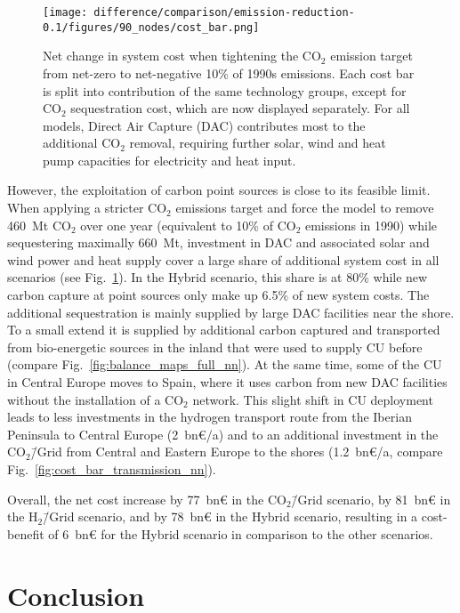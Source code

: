 \documentclass[twocolumn]{article}
\newcommand{\COtwo}{CO$_2$}
\newcommand{\carbon}{CO$_2$}
\newcommand{\carbongrid}{CO$_2$\=/Grid}
\newcommand{\carbonscenario}{CO$_2$\=/Grid scenario}
\newcommand{\hydrogenscenario}{H$_2$\=/Grid scenario}
\newcommand{\hybridscenario}{Hybrid scenario}
\begin{document}
\begin{figure}[htb!]
    \centering
    \texttt{[image: difference/comparison/emission-reduction-0.1/figures/90\_nodes/cost\_bar.png]}
    \caption[short]{Net change in system cost when tightening the \COtwo{} emission target from net-zero to net-negative 10\% of 1990s emissions. Each cost bar is split into contribution of the same technology groups, except for \carbon{} sequestration cost, which are now displayed separately. For all models, Direct Air Capture (DAC) contributes most to the additional \carbon{} removal, requiring further solar, wind and heat pump capacities for electricity and heat input.}
    \label{fig:net-negative_cost_bar}
\end{figure}


However, the exploitation of carbon point sources is close to its feasible limit. When applying a stricter \carbon{} emissions target and force the model to remove 460~Mt \carbon{} over one year (equivalent to 10\% of \carbon{} emissions in 1990) while sequestering maximally 660~Mt, investment in DAC and associated solar and wind power and heat supply cover a large share of additional system cost in all scenarios (see Fig.~\ref{fig:net-negative_cost_bar}). In the \hybridscenario{}, this share is at 80\% while new carbon capture at point sources only make up 6.5\% of new system costs. The additional sequestration is mainly supplied by large DAC facilities near the shore. To a small extend it is supplied by additional carbon captured and transported from bio-energetic sources in the inland that were used to supply CU before (compare Fig.~\ref{fig:balance_maps_full_nn}). At the same time, some of the CU in Central Europe moves to Spain, where it uses carbon from new DAC facilities without the installation of a \COtwo{} network. This slight shift in CU deployment leads to less investments in the hydrogen transport route from the Iberian Peninsula to Central Europe (2~bn€/a) and to an additional investment in the \carbongrid{} from Central and Eastern Europe to the shores (1.2~bn€/a, compare Fig.~\ref{fig:cost_bar_transmission_nn}).

Overall, the net cost increase by 77~bn€ in the \carbonscenario{}, by 81~bn€ in the \hydrogenscenario{}, and by 78~bn€ in the \hybridscenario{}, resulting in a cost-benefit of 6~bn€ for the \hybridscenario{} in comparison to the other scenarios.



\section{Conclusion}
\label{sec:conclusion}
\end{document}
